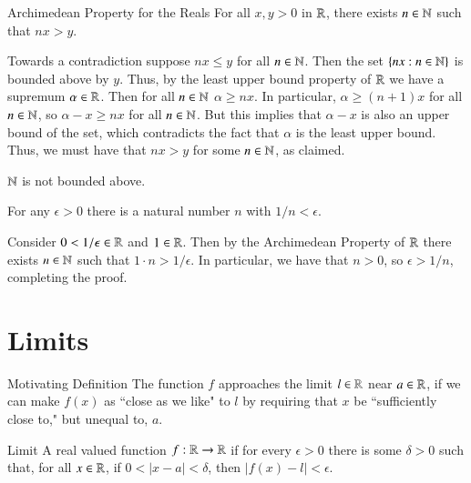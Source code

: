 \documentclass[12pt]{report}
\begin{document}
\begin{thm}{Archimedean Property for the Reals}{}
    For all $x,y > 0$ in $\mathbb R$, there exists $n \in \mathbb N$ such that $nx > y$.
\end{thm}
\begin{proof*}{}{}
    Towards a contradiction suppose $nx \leq y$ for all $n \in \mathbb N$. Then the set $\{nx: n \in \mathbb N\}$ is bounded above by $y$. Thus, by the least upper bound property of $\mathbb R$ we have a supremum $\alpha \in \mathbb R$. Then for all $n \in \mathbb N$ $\alpha \geq nx$. In particular, $\alpha \geq (n+1)x$ for all $n \in \mathbb N$, so $\alpha - x \geq nx$ for all $n \in \mathbb N$. But this implies that $\alpha - x$ is also an upper bound of the set, which contradicts the fact that $\alpha$ is the least upper bound. Thus, we must have that $nx > y$ for some $n \in \mathbb N$, as claimed.
\end{proof*}

\begin{cor}{}{}
    $\mathbb N$ is not bounded above.
\end{cor}


\begin{cor}{}{}
    For any $\epsilon > 0$ there is a natural number $n$ with $1/n < \epsilon$.
\end{cor}
\begin{proof*}{}{}
    Consider $0<1/\epsilon \in \mathbb R$ and $1 \in \mathbb R$. Then by the Archimedean Property of $\mathbb R$ there exists $n \in \mathbb N$ such that $1\cdot n > 1/\epsilon$. In particular, we have that $n > 0$, so $\epsilon > 1/n$, completing the proof.
\end{proof*}




\section{Limits}

\begin{rmk}{Motivating Definition}{}
    The function $f$ approaches the limit $l \in \mathbb R$ near $a \in \mathbb R$, if we can make $f(x)$ as ``close as we like" to $l$ by requiring that $x$ be ``sufficiently close to," but unequal to, $a.$
\end{rmk}

\begin{defn}{Limit}{}
    A real valued function $f:\mathbb R\rightarrow \mathbb R$  if for every $\epsilon > 0$ there is some $\delta > 0$ such that, for all $x \in \mathbb R$, if $0 < |x-a| < \delta$, then $|f(x) - l| < \epsilon$.
\end{defn}
\end{document}
